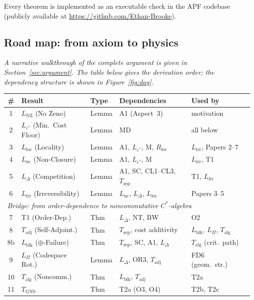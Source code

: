 \documentclass[11pt]{article}
\theoremstyle{remark}
\begin{document}
Every theorem is implemented as an executable check in the APF codebase (publicly available at \url{https://github.com/Ethan-Brooke}).

\subsection{Road map: from axiom to physics}

\noindent\textit{A narrative walkthrough of the complete argument is given in Section~\ref{sec:argument}.  The table below gives the derivation order; the dependency structure is shown in Figure~\ref{fig:dag}.}

\begin{center}
\smallskip
\footnotesize
\setlength{\tabcolsep}{4pt}
\begin{tabular*}{\textwidth}{@{\extracolsep{\fill}}clllll@{}}
\toprule
\textbf{\#} & \textbf{Result} & \textbf{Type} & \textbf{Dependencies} & \textbf{Used by} \\
\midrule
1 & $L_{\mathrm{NZ}}$ (No Zeno) & Lemma & A1 (Aspect~3) & motivation \\
2 & $L_{\varepsilon^*}$ (Min.\ Cost Floor) & Lemma & MD & all below \\
3 & $L_{\mathrm{loc}}$ (Locality) & Lemma & A1, $L_{\varepsilon^*}$, M, $R_{\mathrm{loc}}$ & $L_{\mathrm{irr}}$, Papers 2--7 \\
4 & $L_{\mathrm{nc}}$ (Non-Closure) & Lemma & A1, $L_{\varepsilon^*}$, M & $L_{\mathrm{irr}}$, T1 \\
5 & $L_{\Delta}$ (Competition) & Lemma & A1, SC, CL1--CL3, $T_{\mathrm{sep}}$ & T1, $L_{\mathrm{irr}}$ \\
6 & $L_{\mathrm{irr}}$ (Irreversibility) & Lemma & $L_{\mathrm{nc}}$, $L_\Delta$, $L_{\mathrm{loc}}$ & Papers 3--5 \\
\midrule
\multicolumn{5}{l}{\textit{Bridge: from order-dependence to noncommutative $C^*$-algebra}} \\
\midrule
7 & T1 (Order-Dep.) & Thm & $L_\Delta$, NT, BW & O2 \\
8 & $T_{\mathrm{adj}}$ (Self-Adjoint.) & Thm & $T_{\mathrm{sep}}$, cost additivity & $L_{\mathrm{blk}}$, $L_\Pi$, $T_{\mathrm{alg}}$ \\
8b & $L_{\mathrm{blk}}$ ($\oplus$-Failure) & Thm & $T_{\mathrm{sep}}$, SC, A1, $L_\Delta$ & $T_{\mathrm{alg}}$ (crit.\ path) \\
9 & $L_\Pi$ (Codespace Rot.) & Lemma & $L_\Delta$, OR3, $T_{\mathrm{adj}}$ & FD6 (geom.\ str.) \\
10 & $T_{\mathrm{alg}}$ (Noncomm.) & Thm & $L_{\mathrm{blk}}$, $T_{\mathrm{adj}}$ & T2a \\
11 & $T_{\mathrm{GNS}}$ & Thm & T2a (O3, O4) & T2b, T2c \\
\bottomrule
\end{tabular*}
\label{tab:deriv_order}
\end{center}
\end{document}
